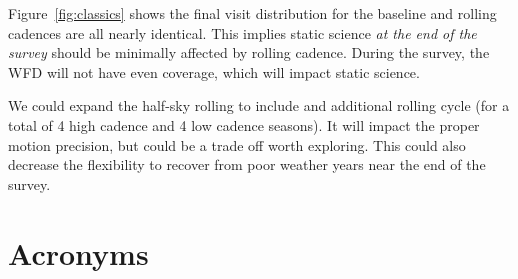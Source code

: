 \documentclass[modern]{aastex62}
\begin{document}
Figure~\ref{fig:classics} shows the final visit distribution for the baseline and rolling cadences are all nearly identical. This implies static science {\emph{at the end of the survey}} should be minimally affected by rolling cadence. During the survey, the WFD will not have even coverage, which will impact static science.

We could expand the half-sky rolling to include and additional rolling cycle (for a total of 4 high cadence and 4 low cadence seasons). It will impact the proper motion precision, but could be a trade off worth exploring. This could also decrease the flexibility to recover from poor weather years near the end of the survey.





\section{Acronyms} \label{sec:acronyms}

\end{document}
